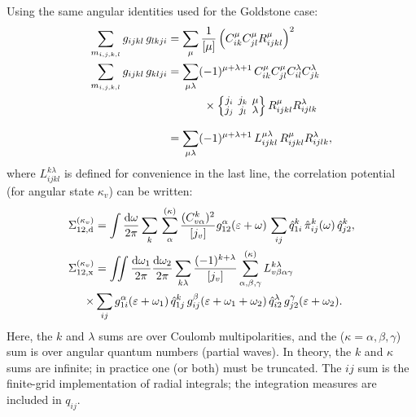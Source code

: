 \documentclass[10pt,twocolumn,a4paper]{article}%
\newcommand{\sixj}[6]{\renewcommand\arraystretch{0.75}\setlength\arraycolsep{2pt}\small\ensuremath{\begin{Bmatrix}#1&#2&#3\\#4&#5&#6\end{Bmatrix}}}	%
\def\d{\ensuremath{{\rm d}}}
\def\en{\ensuremath{\varepsilon}}
\renewcommand{\a}{\ensuremath{\alpha}}
\renewcommand{\b}{\ensuremath{\beta}}
\newcommand{\g}{\ensuremath{\gamma}}
\renewcommand{\k}{\ensuremath{\kappa}}
\newcommand{\w}{\ensuremath{\omega}}
\begin{document}
Using the same angular identities used for the Goldstone case:
\begin{align}
\sum_{m_{i,j,k,l}}  g_{ijkl} \, g_{lkji}
    &= \sum_\mu \frac{1}{[\mu]} \left( C^\mu_{ik}C^\mu_{jl} R^\mu_{ijkl}\right)^2 \\
\sum_{m_{i,j,k,l}}  g_{ijkl} \, g_{klji}
        &=\sum_{\mu \lambda}(-1)^{\mu+\lambda+1}\, C^\mu_{ik}C^\mu_{jl}C^\lambda_{il}C^\lambda_{jk} \notag \\
    &\phantom{=\sum_{\mu \lambda}}~~\times \sixj{j_i}{j_k}{\mu}{j_j}{j_l}{\lambda}R^\mu_{ijkl}R^\lambda_{ijlk}\\
            &=\sum_{\mu \lambda}(-1)^{\mu+\lambda+1} \, L^{\mu\lambda}_{ijkl} \, R^\mu_{ijkl}R^\lambda_{ijlk},
\end{align}
where $L^{k\lambda}_{ijkl}$ is defined for convenience in the last line,
the correlation potential (for angular state $\k_v$) can be written:
\begin{align}
\Sigma^{(\k_v)}_{12,{\rm d}}
&= \int\frac{\d \w}{2\pi} \sum_k\,\sum_{\alpha}^{(\kappa)} \frac{ (C^k_{v\a})^2}{[j_v]}
g^{\alpha}_{12}(\en+\w) \, \sum_{ij} \hat q^k_{1i} \, \hat \pi_{ij}^{k}(\w) \, \hat q^k_{j2},
\label{eq:RadialSigmaDir}
\\
\Sigma^{(\k_v)}_{12,{\rm x}}
&= \iint\frac{\d\w_1}{2\pi} \frac{\d\w_2}{2\pi} \sum_{k\lambda}\frac{(-1)^{k+\lambda}}{[j_v]}
\sum^{(\k)}_{\a,\b,\g}
L_{v\b\a\g}^{k\lambda}
\notag\\
\times&\sum_{ij}  g^\a_{1i}(\en+\w_1)\,\hat q^k_{1j}\,g^\b_{ij}(\en+\w_1+\w_2)\,\hat q^\lambda_{i2}\,g^\g_{j2}(\en+\w_2).
\label{eq:RadialSigmaExch}
\end{align}
Here, the $k$ and $\lambda$ sums are over Coulomb multipolarities, and the ($\k=\a,\b,\g$) sum is over angular quantum numbers (partial waves).
In theory, the $k$ and $\kappa$ sums are infinite; in practice one (or both) must be truncated.
The $ij$ sum is the finite-grid implementation of radial integrals; the integration measures are included in $q_{ij}$.
\end{document}
